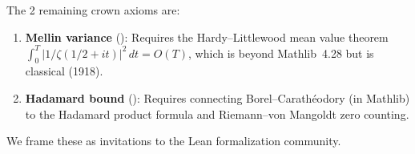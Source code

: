 \documentclass[11pt,a4paper]{article}
\begin{document}
The 2 remaining crown axioms are:
\begin{enumerate}
  \item \textbf{Mellin variance} ():
    Requires the Hardy--Littlewood mean value theorem
    $\int_0^T |1/\zeta(1/2+it)|^2\,dt = O(T)$, which is beyond
    Mathlib~4.28 but is classical (1918).
  \item \textbf{Hadamard bound} ():
    Requires connecting Borel--Carath\'eodory (in Mathlib) to the
    Hadamard product formula and Riemann--von Mangoldt zero counting.
\end{enumerate}

We frame these as invitations to the Lean formalization community.

\end{document}
